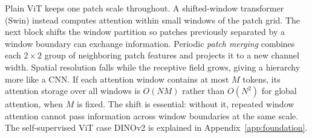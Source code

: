 Plain ViT keeps one patch scale throughout. A shifted-window transformer
(Swin) instead computes attention within small windows of the patch grid.
The next block shifts the window partition so patches previously separated by
a window boundary can exchange information. Periodic \emph{patch merging}
combines each $2\times2$ group of neighboring patch features and projects it
to a new channel width. Spatial resolution falls while the receptive field
grows, giving a hierarchy more like a CNN. If each attention window contains
at most $M$ tokens, its attention storage over all windows is $O(NM)$ rather
than $O(N^2)$ for global attention, when $M$ is fixed. The shift is essential:
without it, repeated window attention cannot pass information across window
boundaries at the same scale.
The self-supervised ViT case DINOv2 is explained in
Appendix~\ref{app:foundation}.

